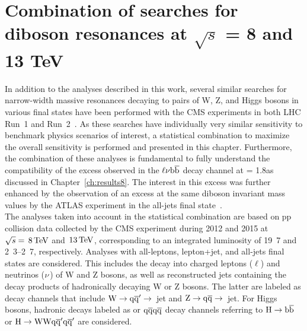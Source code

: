 \chapter{Combination of searches for diboson resonances at $\sqrt{s}$ = 8 and 13 TeV}
\label{ch:combination}

In addition to the analyses described in this work, several similar searches for narrow-width massive resonances decaying to pairs of W, Z, and Higgs bosons in various final states have been performed with the CMS experiments in both LHC Run~1 and Run~2~\cite{CMS-PAS-EXO-15-002,Khachatryan:2016cfx,Khachatryan:2014gha, Khachatryan:2014hpa, Khachatryan:2015bma, Khachatryan:2014xja,Khachatryan:2016yji,Khachatryan:2015ywa}.
As these searches have individually very similar sensitivity to benchmark physics scenarios of interest, a statistical combination to maximize the overall sensitivity is performed and presented in this chapter.
Furthermore, the combination of these analyses is fundamental to fully understand the compatibility of the excess observed in the $\ell\nu{\mathrm{b}\overline{\mathrm{b}}}$ decay channel at \mWH = 1.8\TeV as discussed in Chapter~\ref{ch:results8}.
The interest in this excess was further enhanced by the observation of an excess at the same diboson invariant mass values by the ATLAS experiment in the all-jets final state~\cite{Aad:2015owa}.\\

The analyses taken into account in the statistical combination are based on pp collision data collected by the CMS experiment during 2012 and 2015 at $\sqrt{s} = \text{\,8}{\ensuremath{\,\text{Te\hspace{-.08em}V}}}$ and $\text{\,13}{\ensuremath{\,\text{Te\hspace{-.08em}V}}}$, corresponding to an integrated luminosity of \unit{19.7}{\fbinv} and \unit{2.3}--\unit{2.7}{\fbinv}, respectively.
Analyses with all-leptons, lepton+jet, and all-jets final states are considered. This includes the decay into charged leptons ($\ell$) and neutrinos ($\nu$) of W and Z bosons, as well as reconstructed jets containing the decay products of hadronically decaying W or Z bosons. The latter are labeled as \qqbar decay channels that include $\rm W\to\mathrm{q}\overline{\mathrm{q}}'\to$~jet and $\rm Z\to\mathrm{q}\overline{\mathrm{q}}\to$~jet. For Higgs bosons, hadronic decays labeled as \bbbar or $\mathrm{q}\overline{\mathrm{q}}\mathrm{q}\overline{\mathrm{q}}$ decay channels referring to $\rm H\to{\mathrm{b}\overline{\mathrm{b}}}$ or $\rm H\to\mathrm{W}\mathrm{W}\mathrm{q}\overline{\mathrm{q}}^\prime\mathrm{q}\overline{\mathrm{q}}^\prime$ are considered.

